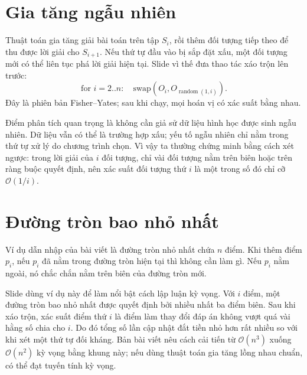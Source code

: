 \documentclass[11pt]{article}
\newcommand{\Oh}{\mathcal{O}}
\begin{document}
\section{Gia tăng ngẫu nhiên}

Thuật toán gia tăng giải bài toán trên tập \(S_i\), rồi thêm đối tượng tiếp
theo để thu được lời giải cho \(S_{i+1}\). Nếu thứ tự đầu vào bị sắp đặt xấu,
một đối tượng mới có thể liên tục phá lời giải hiện tại. Slide vì thế đưa
thao tác xáo trộn lên trước:
\[
  \text{for } i=2..n:\quad
  \text{swap}(O_i,O_{\operatorname{random}(1,i)}).
\]
Đây là phiên bản Fisher--Yates; sau khi chạy, mọi hoán vị có xác suất bằng
nhau.

Điểm phân tích quan trọng là không cần giả sử dữ liệu hình học được sinh ngẫu
nhiên. Dữ liệu vẫn có thể là trường hợp xấu; yếu tố ngẫu nhiên chỉ nằm trong
thứ tự xử lý do chương trình chọn. Vì vậy ta thường chứng minh bằng cách xét
ngược: trong lời giải của \(i\) đối tượng, chỉ vài đối tượng nằm trên biên hoặc
trên ràng buộc quyết định, nên xác suất đối tượng thứ \(i\) là một trong số đó
chỉ cỡ \(\Oh(1/i)\).

\section{Đường tròn bao nhỏ nhất}

Ví dụ dẫn nhập của bài viết là đường tròn nhỏ nhất chứa \(n\) điểm. Khi thêm
điểm \(p_i\), nếu \(p_i\) đã nằm trong đường tròn hiện tại thì không cần làm
gì. Nếu \(p_i\) nằm ngoài, nó chắc chắn nằm trên biên của đường tròn mới.

\begin{center}
\end{center}

Slide dùng ví dụ này để làm nổi bật cách lập luận kỳ vọng. Với \(i\) điểm, một
đường tròn bao nhỏ nhất được quyết định bởi nhiều nhất ba điểm biên. Sau khi
xáo trộn, xác suất điểm thứ \(i\) là điểm làm thay đổi đáp án không vượt quá
vài hằng số chia cho \(i\). Do đó tổng số lần cập nhật đắt tiền nhỏ hơn rất
nhiều so với khi xét một thứ tự đối kháng. Bản bài viết nêu cách cải tiến từ
\(\Oh(n^3)\) xuống \(\Oh(n^2)\) kỳ vọng bằng khung này; nếu dùng thuật toán
gia tăng lồng nhau chuẩn, có thể đạt tuyến tính kỳ vọng.
\end{document}
